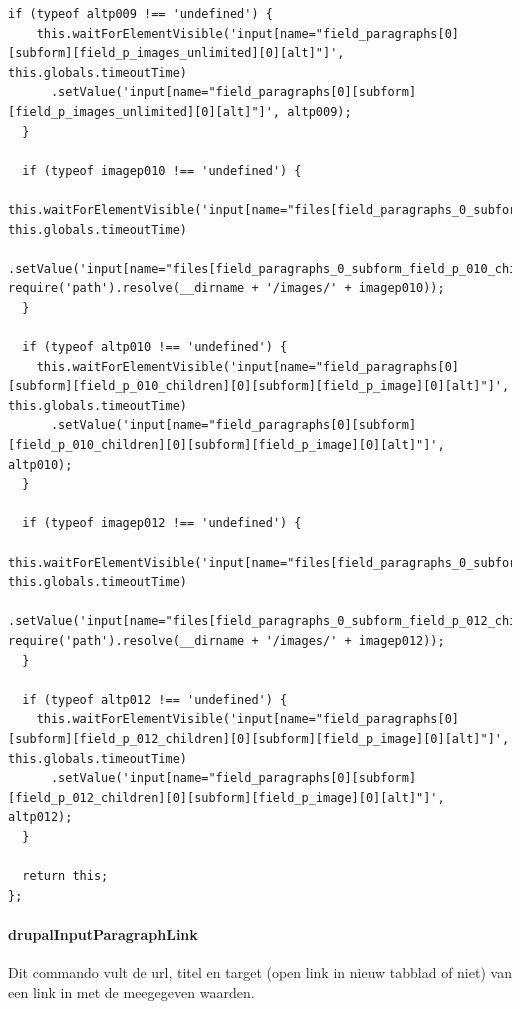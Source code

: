 \begin{lstlisting}[breaklines=true]
  if (typeof altp009 !== 'undefined') {
    this.waitForElementVisible('input[name="field_paragraphs[0][subform][field_p_images_unlimited][0][alt]"]', this.globals.timeoutTime)
      .setValue('input[name="field_paragraphs[0][subform][field_p_images_unlimited][0][alt]"]', altp009);
  }

  if (typeof imagep010 !== 'undefined') {
    this.waitForElementVisible('input[name="files[field_paragraphs_0_subform_field_p_010_children_0_subform_field_p_image_0]"]', this.globals.timeoutTime)
      .setValue('input[name="files[field_paragraphs_0_subform_field_p_010_children_0_subform_field_p_image_0]"]', require('path').resolve(__dirname + '/images/' + imagep010));
  }

  if (typeof altp010 !== 'undefined') {
    this.waitForElementVisible('input[name="field_paragraphs[0][subform][field_p_010_children][0][subform][field_p_image][0][alt]"]', this.globals.timeoutTime)
      .setValue('input[name="field_paragraphs[0][subform][field_p_010_children][0][subform][field_p_image][0][alt]"]', altp010);
  }

  if (typeof imagep012 !== 'undefined') {
    this.waitForElementVisible('input[name="files[field_paragraphs_0_subform_field_p_012_children_0_subform_field_p_image_0]"]', this.globals.timeoutTime)
      .setValue('input[name="files[field_paragraphs_0_subform_field_p_012_children_0_subform_field_p_image_0]"]', require('path').resolve(__dirname + '/images/' + imagep012));
  }

  if (typeof altp012 !== 'undefined') {
    this.waitForElementVisible('input[name="field_paragraphs[0][subform][field_p_012_children][0][subform][field_p_image][0][alt]"]', this.globals.timeoutTime)
      .setValue('input[name="field_paragraphs[0][subform][field_p_012_children][0][subform][field_p_image][0][alt]"]', altp012);
  }
  
  return this;
};
\end{lstlisting}


\clearpage
\paragraph{drupalInputParagraphLink}
\label{commando21}
Dit commando vult de url, titel en target (open link in nieuw tabblad of niet) van een link in met de meegegeven waarden.
